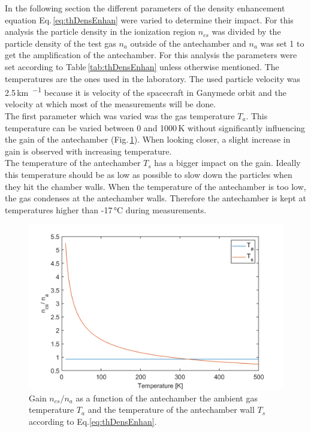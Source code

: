 		In the following section the different parameters of the density enhancement equation Eq.\,\eqref{eq:thDensEnhan} were varied to determine their impact. For this analysis the particle density in the ionization region $n_{cs}$ was divided by the particle density of the test gas $n_a$ outside of the antechamber and $n_a$ was set 1 to get the amplification of the antechamber. For this analysis the parameters were set according to Table\,\ref{tab:thDensEnhan} unless otherwise mentioned. The temperatures are the ones used in the laboratory. The used particle velocity was 2.5\,\si{\kilo\meter\per\sec} because it is velocity of the spacecraft in Ganymede orbit and the velocity at which most of the measurements will be done.\\		
		The first parameter which was varied was the gas temperature $T_a$. This temperature can be varied between 0 and 1000\,\si{\kelvin} without significantly influencing the gain of the antechamber (Fig.\,\ref{th:densEnhTaTs}). When looking closer, a slight increase in gain is observed with increasing temperature.\\
		The temperature of the antechamber $T_s$ has a bigger impact on the gain. Ideally this temperature should be as low as possible to slow down the particles when they hit the chamber walls. When the temperature of the antechamber is too low, the gas condenses at the antechamber walls. Therefore the antechamber is kept at temperatures higher than -17\,\si{\degreeCelsius} during measurements. \\
		\begin{figure}[h!] %
			\centering
			\includegraphics[width= .7\textwidth]{Bilder/Ta_Ts.png}
			\caption{Gain $n_{cs}/n_a$ as a function of the antechamber the ambient gas temperature $T_a$ and the temperature of the antechamber wall $T_s$ according to Eq.\eqref{eq:thDensEnhan}.}
			\label{th:densEnhTaTs}
		\end{figure}
